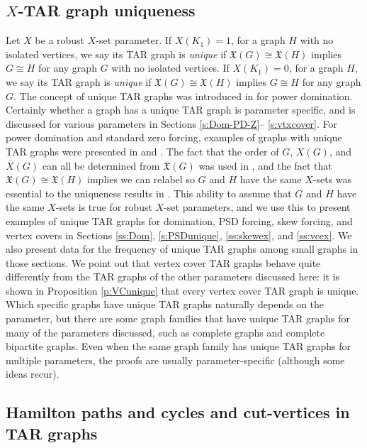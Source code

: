 \documentclass{article}
\numberwithin{figure}{section}
\numberwithin{table}{section}
\numberwithin{equation}{section}
\theoremstyle{definition}
\theoremstyle{definition}
\theoremstyle{definition}
\newcommand{\ol}{\overline}
\newcommand{\xbar}{\ol X}
\newcommand{\xtar}{\mathfrak{X}}%
\begin{document}
{ %
\subsection{$X$-TAR graph uniqueness}\label{ss:uni}
Let $X$ be a robust $X$-set parameter.  If $X(K_1)=1$, for a graph $H$ with no isolated vertices, we say its  TAR  graph  is \emph{unique} if  $\xtar(G)\cong\xtar(H)$  implies $G\cong H$  for any graph $G$ with no isolated vertices. If $X(K_1)=0$, for a graph $H$, we say its  TAR  graph  is \emph{unique} if  $\xtar(G)\cong\xtar(H)$  implies $G\cong H$  for any graph $G$.   The concept of  unique TAR graphs was introduced in \cite{PDrecon} for power domination. Certainly whether a graph has a unique TAR graph is parameter specific, and is discussed for various parameters in Sections \ref{s:Dom-PD-Z}-- \ref{s:vtxcover}.  For power domination and standard zero forcing, examples of graphs with unique TAR graphs were presented in \cite{PDrecon} and \cite{XTARiso}.  The fact that the order of $G$,  $X(G)$, and $\xbar(G)$ can all be determined from $\xtar(G)$ was used in \cite{PDrecon}, and the fact that $\xtar(G)\cong\xtar(H)$ implies we can relabel so $G$ and $H$ have the same $X$-sets was essential to the uniqueness results in \cite{XTARiso}. This ability to assume that $G$ and $H$ have the same $X$-sets is true for robust $X$-set parameters, and we use this to  present examples of unique TAR graphs for domination, PSD forcing,  skew forcing, and vertex covers in Sections \ref{ss:Dom}, %
\ref{s:PSDunique},  \ref{ss:skewex}, and \ref{ss:vcex}.  We also present data for the frequency of unique TAR graphs among small graphs in those sections.
 We point out that vertex cover TAR graphs behave quite differently from the TAR graphs of the other parameters discussed here: it is shown in Proposition \ref{p:VCunique} that every vertex cover TAR graph is unique.
Which specific  graphs have unique TAR graphs naturally depends on the parameter, but there are some graph families that have unique TAR graphs for many of the parameters discussed, such as complete graphs  and complete bipartite graphs. %
Even when the same graph family has unique TAR graphs for multiple parameters, the proofs are usually parameter-specific (although some ideas recur).

\subsection{Hamilton paths and cycles and cut-vertices in TAR graphs}\label{ss:Ham}
 
}
\end{document}

